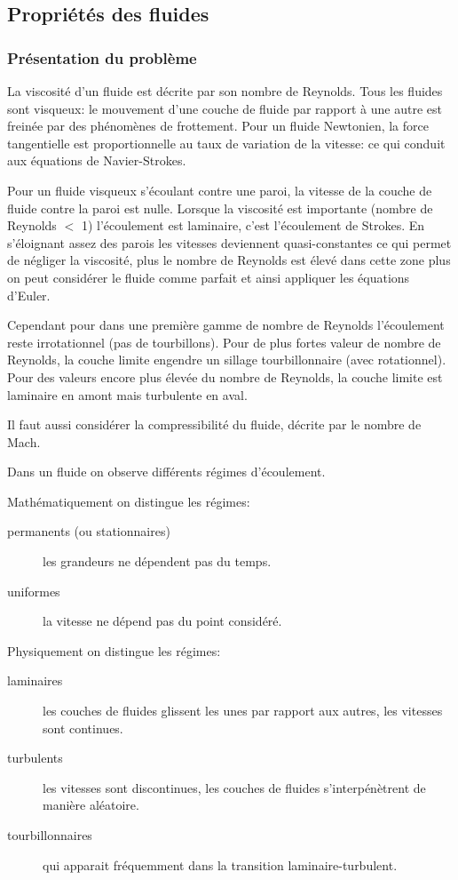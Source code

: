 \documentclass[10pt,a4paper]{article}
\begin{document}
\subsection{Propriétés des fluides}

\subsubsection{Présentation du problème \cite{intromecaflu}}
La viscosité d'un fluide est décrite par son nombre de Reynolds\cite{nbreynolds}. Tous les fluides sont visqueux: le mouvement d'une couche de fluide par rapport à une autre est freinée par des phénomènes de frottement. Pour un fluide Newtonien, la force tangentielle est proportionnelle au taux de variation de la vitesse: ce qui conduit aux équations de Navier-Strokes.

Pour un fluide visqueux s'écoulant contre une paroi, la vitesse de la couche de fluide contre la paroi est nulle. Lorsque la viscosité est importante (nombre de Reynolds $<$ 1) l'écoulement est laminaire, c'est l'écoulement de Strokes. En s'éloignant assez des parois les vitesses deviennent quasi-constantes ce qui permet de négliger la viscosité, plus le nombre de Reynolds est élevé dans cette zone plus on peut considérer le fluide comme parfait et ainsi appliquer les équations d'Euler.

Cependant pour dans une première gamme de nombre de Reynolds l'écoulement reste irrotationnel (pas de tourbillons). Pour de plus fortes valeur de nombre de Reynolds, la couche limite engendre un sillage tourbillonnaire (avec rotationnel). Pour des valeurs encore plus élevée du nombre de Reynolds, la couche limite est laminaire en amont mais turbulente en aval.

Il faut aussi considérer la compressibilité du fluide, décrite par le nombre de Mach\cite{nbmach}.

Dans un fluide on observe différents régimes d'écoulement. 

Mathématiquement on distingue les régimes:
\begin{description}
\item[permanents (ou stationnaires)] les grandeurs ne dépendent pas du temps.
\item[uniformes] la vitesse ne dépend pas du point considéré.
\end{description}

Physiquement on distingue les régimes:
\begin{description}
\item[laminaires] les couches de fluides glissent les unes par rapport aux autres, les vitesses sont continues.
\item[turbulents] les vitesses sont discontinues, les couches de fluides s'interpénètrent de manière aléatoire.
\item[tourbillonnaires] qui apparait fréquemment dans la transition laminaire-turbulent.
\end{description}
\end{document}
